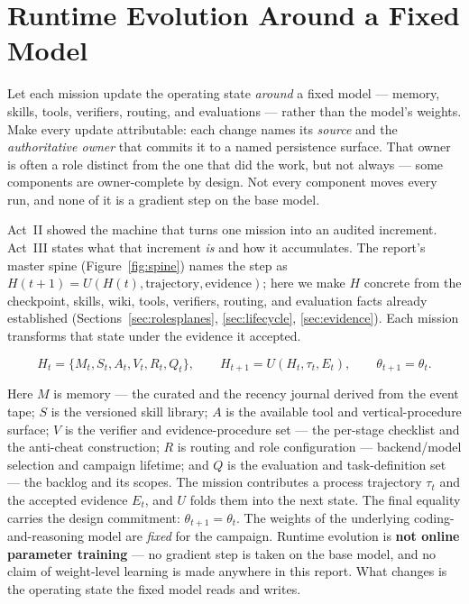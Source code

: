 \section{Runtime Evolution Around a Fixed Model}
\label{sec:evolution}\label{sec:runtimeevolution}

\begin{designbox}
Let each mission update the operating state \emph{around} a fixed model --- memory,
skills, tools, verifiers, routing, and evaluations --- rather than the model's
weights. Make every update attributable: each change names its \emph{source} and
the \emph{authoritative owner} that commits it to a named persistence surface. That
owner is often a role distinct from the one that did the work, but not always ---
some components are owner-complete by design. Not every component moves every run,
and none of it is a gradient step on the base model.
\end{designbox}

Act~II showed the machine that turns one mission into an audited increment. Act~III
states what that increment \emph{is} and how it accumulates. The report's master
spine (Figure~\ref{fig:spine}) names the step as $H(t{+}1)=U(H(t),\text{trajectory},
\text{evidence})$; here we make $H$ concrete from the checkpoint, skills, wiki,
tools, verifiers, routing, and evaluation facts already established
(Sections~\ref{sec:rolesplanes}, \ref{sec:lifecycle}, \ref{sec:evidence}). Each
mission transforms that state under the evidence it accepted.

\begin{equation}
H_t = \{M_t,S_t,A_t,V_t,R_t,Q_t\},
\qquad
H_{t+1}=U(H_t,\tau_t,E_t),
\qquad
\theta_{t+1}=\theta_t .
\end{equation}

Here $M$ is memory --- the curated  and the recency journal
derived from the event tape; $S$ is the versioned skill library; $A$ is the
available tool and vertical-procedure surface; $V$ is the verifier and
evidence-procedure set --- the per-stage checklist and the anti-cheat construction;
$R$ is routing and role configuration --- backend/model selection and campaign
lifetime; and $Q$ is the evaluation and task-definition set --- the backlog and its
scopes. The mission contributes a process trajectory $\tau_t$ and the accepted
evidence $E_t$, and $U$ folds them into the next state. The final equality carries
the design commitment: $\theta_{t+1}=\theta_t$. The weights of the underlying
coding-and-reasoning model are \emph{fixed} for the campaign. Runtime evolution is
\textbf{not online parameter training} --- no gradient step is taken on the base
model, and no claim of weight-level learning is made anywhere in this report. What
changes is the operating state the fixed model reads and writes.


